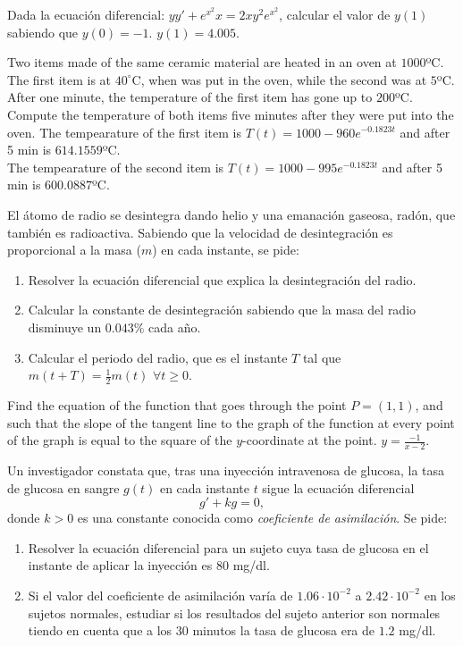 {Dada la ecuación diferencial: $yy'+ e^{x^2}x = 2xy^2e^{x^2}$, calcular el valor de $y(1)$ sabiendo que $y(0)=-1$.}
{$y(1)=4.005$.}
{}


{Two items made of the same ceramic material are heated in an oven
at $1000$ºC.
The first item is at $40^\circ$C, when was put in the oven, while the second was at $5$ºC.
After one minute, the temperature of the first item has gone up to $200$ºC.
Compute the temperature of both items five minutes after they were put into the oven.
}
{The tempearature of the first item is $T(t)=1000-960e^{-0.1823t}$ and after 5 min is $614.1559$ºC.\\
The tempearature of the second item is $T(t)=1000-995e^{-0.1823t}$ and after 5 min is $600.0887$ºC.
}
{}


{El átomo de radio se desintegra dando helio y una emanación gaseosa, radón, que también es radioactiva.
Sabiendo que la velocidad de desintegración es proporcional a la masa ($m$) en cada instante, se pide:
\begin{enumerate}
\item Resolver la ecuación diferencial que explica la desintegración del radio.
\item Calcular la constante de desintegración sabiendo que la masa del radio disminuye un $0.043\%$ cada año.
\item Calcular el periodo del radio, que es el instante $T$ tal que  $m(t+T)=\frac{1}{2}m(t)$ $\forall t\geq 0$.
\end{enumerate}
}
{
}
{}


{Find the equation of the function that goes through the point $P=(1,1)$, and such that the slope of the tangent line to the graph of the function at every point of the graph is equal to the square of the $y$-coordinate at the point.
}
{$y=\frac{-1}{x-2}$.
}
{}


{Un investigador constata que, tras una inyección intravenosa de glucosa, la tasa de glucosa en sangre $g(t)$ en cada instante $t$ sigue la ecuación diferencial
\[
g'+kg=0,
\]
donde $k>0$ es una constante conocida como \emph{coeficiente de asimilación}. Se pide:
\begin{enumerate}
\item Resolver la ecuación diferencial para un sujeto cuya tasa de glucosa en el instante de aplicar la inyección es 80 mg/dl.
\item Si el valor del coeficiente de asimilación varía de $1.06\cdot 10^{-2}$ a $2.42\cdot 10^{-2}$ en los sujetos normales, estudiar si los resultados del sujeto anterior son normales tiendo en cuenta que a los 30 minutos la tasa de glucosa era de $1.2$ mg/dl.
\end{enumerate}
}
{
}
{}


